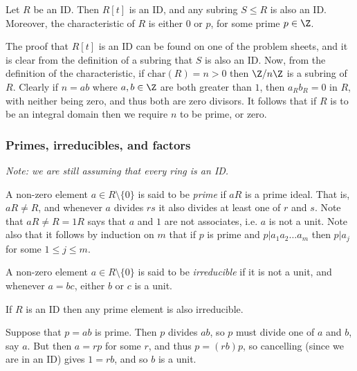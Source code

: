 \documentclass{maths}
\begin{document}
\begin{lem}
    Let $R$ be an ID.
    Then $R[t]$ is an ID, and any subring $S\leqslant R$ is also an ID.
    Moreover, the characteristic of $R$ is either $0$ or $p$, for some prime $p\in\Z$.
\end{lem}

\begin{prf}
    The proof that $R[t]$ is an ID can be found on one of the problem sheets, and it is clear from the definition of a subring that $S$ is also an ID.
    Now, from the definition of the characteristic, if $\textrm{char}(R)=n>0$ then $\Z/n\Z$ is a subring of $R$.
    Clearly if $n=ab$ where $a,b\in\Z$ are both greater than $1$, then $a_Rb_R=0$ in $R$, with neither being zero, and thus both are zero divisors.
    It follows that if $R$ is to be an integral domain then we require $n$ to be prime, or zero.
\end{prf}

\subsubsection{Primes, irreducibles, and factors}

\emph{Note: we are still assuming that every ring is an ID.}

\begin{defn}
    A non-zero element $a\in R\setminus\{0\}$ is said to be \emph{prime} if $aR$ is a prime ideal.
    That is, $aR\neq R$, and whenever $a$ divides $rs$ it also divides at least one of $r$ and $s$.
    Note that $aR\neq R=1R$ says that $a$ and $1$ are not associates, i.e. $a$ is not a unit.
    Note also that it follows by induction on $m$ that if $p$ is prime and $p|a_1 a_2 \ldots a_m$ then $p|a_j$ for some $1\leqslant j\leqslant m$.
\end{defn}

\begin{defn}
    A non-zero element $a\in R\setminus\{0\}$ is said to be \emph{irreducible} if it is not a unit, and whenever $a=bc$, either $b$ or $c$ is a unit.
\end{defn}

\begin{lem}
    If $R$ is an ID then any prime element is also irreducible.
\end{lem}

\begin{prf}
    Suppose that $p=ab$ is prime.
    Then $p$ divides $ab$, so $p$ must divide one of $a$ and $b$, say $a$.
    But then $a=rp$ for some $r$, and thus $p=(rb)p$, so cancelling (since we are in an ID) gives $1=rb$, and so $b$ is a unit.
\end{prf}
\end{document}
